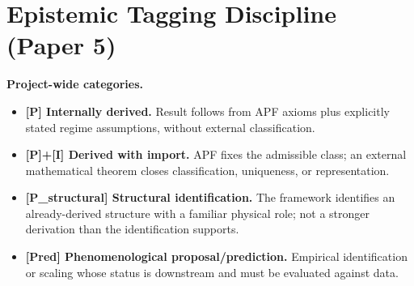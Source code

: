 \documentclass[11pt]{article}
\begin{document}
\section{Epistemic Tagging Discipline (Paper 5)}\label{sec:tagging}

\begin{apfbox}
\textbf{Project-wide categories.}
\begin{itemize}[leftmargin=1.5em,nosep]
    \item \textbf{[P] Internally derived.} Result follows from APF axioms plus
    explicitly stated regime assumptions, without external classification.
    \item \textbf{[P]+[I] Derived with import.} APF fixes the admissible class; an
    external mathematical theorem closes classification, uniqueness, or representation.
    \item \textbf{[P\_structural] Structural identification.} The framework
    identifies an already-derived structure with a familiar physical role; not a
    stronger derivation than the identification supports.
    \item \textbf{[Pred] Phenomenological proposal/prediction.} Empirical
    identification or scaling whose status is downstream and must be evaluated
    against data.
\end{itemize}
\end{apfbox}
\end{document}
